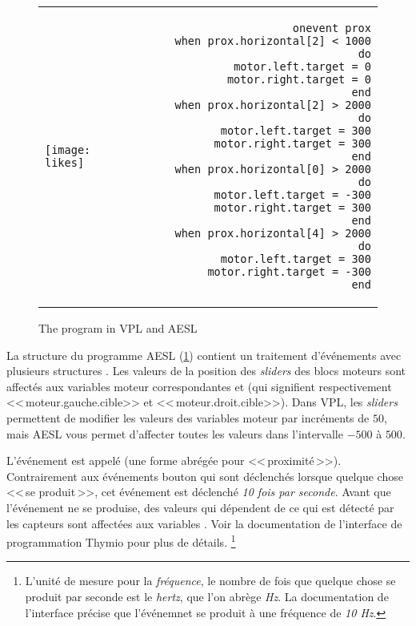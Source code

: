 \begin{figure}[hbt]
\begin{center}
\begin{tabular}{lr}
\texttt{[image: likes]} &
\begin{minipage}[b]{.4\textwidth}
\begin{footnotesize}
\begin{verbatim}
  onevent prox
    when prox.horizontal[2] < 1000 do
      motor.left.target = 0
      motor.right.target = 0
    end
    when prox.horizontal[2] > 2000 do
      motor.left.target = 300
      motor.right.target = 300
    end
    when prox.horizontal[0] > 2000 do
      motor.left.target = -300
      motor.right.target = 300
    end
    when prox.horizontal[4] > 2000 do
      motor.left.target = 300
      motor.right.target = -300
    end
\end{verbatim}
\end{footnotesize}
\end{minipage}
\end{tabular}
\caption{The  program in VPL and AESL}\label{fig.arrays}
\end{center}
\end{figure}

La structure du programme AESL (\cref{fig.arrays}) contient un traitement d'événements
avec plusieurs structures .
Les valeurs de la position des \textit{sliders} des blocs moteurs sont affectés aux
variables moteur correspondantes  et 
(qui signifient respectivement <<\,moteur.gauche.cible>> et <<\,moteur.droit.cible>>).
Dans VPL, les \textit{sliders} permettent de modifier les valeurs des variables moteur
par incréments de $50$, mais AESL vous permet d'affecter toutes les valeurs dans l'intervalle 
$-500$ à $500$.

L'événement est appelé  (une forme abrégée pour <<\,proximité\,>>).
Contrairement aux événements bouton qui sont déclenchés lorsque quelque chose <<\,se produit\,>>,
cet événement est déclenché \emph{10 fois par seconde}.
Avant que l'événement ne se produise, des valeurs qui dépendent de ce qui est détecté par les capteurs
sont affectées aux variables .
Voir la documentation\label{pg.hz} de l'interface de programmation Thymio pour plus de détails.
\footnote{L'unité de mesure pour la \emph{fréquence}, le nombre de fois que quelque chose 
se produit par seconde est le \emph{hertz}, que l'on abrège \emph{Hz}.
La documentation de l'interface précise que l'événemnet {\footnotesize{}} se produit
à une fréquence de \emph{10 Hz}.}

